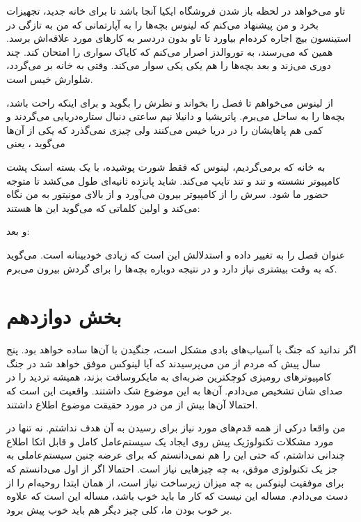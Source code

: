 \begin{journal}
تاو می‌خواهد در لحظه باز شدن فروشگاه ایکیا آنجا باشد تا برای خانه جدید،
تجهیزات بخرد و من پیشنهاد می‌کنم که لینوس بچه‌ها را به آپارتمانی که من
به تازگی در استینسون بیچ اجاره کرده‌ام بیاورد
تا تاو بدون دردسر به کارهای مورد علاقه‌اش برسد. همین که می‌رسند، به
توروالدز اصرار می‌کنم که کایاک سواری را امتحان کند. چند دوری می‌زند و
بعد بچه‌ها را هم یکی یکی سوار می‌کند. وقتی به خانه بر می‌گردد، شلوارش خیس
است.

از لینوس می‌خواهم تا فصل 
را بخواند و نظرش را بگوید و برای اینکه راحت باشد، بچه‌ها را به ساحل
می‌برم. پاتریشیا و دانیلا نیم ساعتی دنبال ستاره‌دریایی می‌گردند و کمی هم
پاهایشان را در دریا خیس می‌کنند ولی چیزی نمی‌گذرد که یکی از آن‌ها می‌گوید
، یعنی 

به خانه که برمی‌گردیم، لینوس که فقط شورت پوشیده، با یک بسته اسنک پشت
کامپیوتر نشسته و تند و تند تایپ می‌کند. شاید پانزده ثانیه‌ای طول می‌کشد
تا متوجه حضور ما شود. سرش را از کامپیوتر بیرون می‌آورد و از بالای
مونیتور به من نگاه می‌کند و اولین کلماتی که می‌گوید این ها هستند:

و بعد: 

عنوان فصل را به  تغییر داده و استدلالش این است که
 زیادی خودبینانه
است. می‌گوید که به وقت بیشتری نیاز دارد و در نتیجه دوباره بچه‌ها را برای
گردش بیرون می‌برم.
\end{journal}

\section{بخش دوازدهم}
اگر ندانید که جنگ با آسیاب‌های بادی مشکل است، جنگیدن با آن‌ها ساده خواهد
بود. پنج سال پیش که مردم از من می‌پرسیدند که آیا لینوکس موفق خواهد شد
در جنگ کامپیوترهای رومیزی کوچکترین ضربه‌ای به مایکروسافت بزند، همیشه
تردید را در صدای شان تشخیص می‌دادم. آن‌ها به این موضوع شک داشتند. واقعیت
این است که احتمالا آن‌ها بیش از من در مورد حقیقت موضوع اطلاع داشتند.

من واقعا درکی از همه قدم‌های مورد نیاز برای رسیدن به آن هدف نداشتم. نه
تنها در مورد مشکلات تکنولوژیک پیش روی ایجاد یک سیستم‌عامل کامل و قابل
اتکا اطلاع چندانی نداشتم، که حتی این را هم نمی‌دانستم که برای عرضه چنین
سیستم‌عاملی به جز یک تکنولوژی موفق، به چه چیزهایی نیاز است. احتمالا اگر
از اول می‌دانستم که برای موفقیت لینوکس به چه میزان زیرساخت نیاز است، از
همان ابتدا روحیه‌ام را از دست می‌دادم. مساله این نیست که کار ما باید خوب
باشد، مساله این است که علاوه بر خوب بودن ما، کلی چیز دیگر هم باید خوب
پیش برود.

